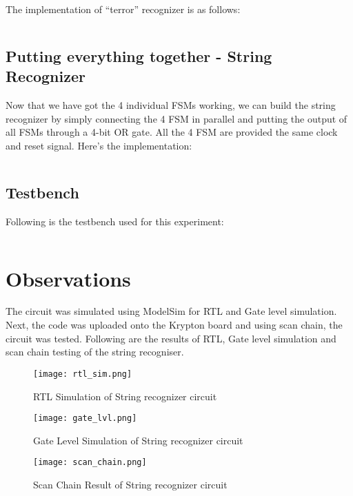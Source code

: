\documentclass[12pt]{article}
\begin{document}
The implementation of ``terror'' recognizer is as follows:

\inputminted[bgcolor=LightGray]{vhdl}{code/terror_recog.vhd}

\subsection{Putting everything together - String Recognizer} %
\label{sub:putting_everything_together_string_recognizer}
Now that we have got the 4 individual FSMs working, we can build the string recognizer by simply connecting the 4 FSM in parallel and putting the output of all FSMs through a 4-bit OR gate. All the 4 FSM are provided the same clock and reset signal. Here's the implementation:

\inputminted[bgcolor=LightGray]{vhdl}{code/string_recog.vhd}

\subsection{Testbench} %
\label{sub:testbench}
Following is the testbench used for this experiment:
\inputminted[bgcolor=LightGray]{vhdl}{code/testbench.vhd}

\section{Observations}

The circuit was simulated using ModelSim for RTL and Gate level simulation. Next, the code was uploaded onto the Krypton board and using scan chain, the circuit was tested. Following are the results of RTL, Gate level simulation and scan chain testing of the string recogniser.

\begin{figure}[H]
	\centering
	\texttt{[image: rtl\_sim.png]}
	\caption{RTL Simulation of String recognizer circuit}
\end{figure}

\begin{figure}[H]
	\centering
	\texttt{[image: gate\_lvl.png]}
	\caption{Gate Level Simulation of String recognizer circuit}
\end{figure}

\begin{figure}[H]
	\centering
	\texttt{[image: scan\_chain.png]}
	\caption{Scan Chain Result of String recognizer circuit}
\end{figure}
\end{document}

